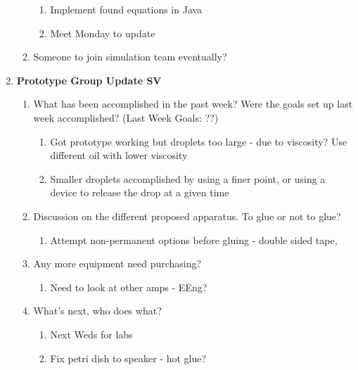 \begin{enumerate}
\begin{enumerate}
\begin{enumerate}
\item  Implement found equations in Java

\item  Meet Monday to update
\end{enumerate}

\item  Someone to join simulation team eventually?\\
\end{enumerate}

\item  \textbf{Prototype Group Update SV}

\begin{enumerate}
\item \textbf{ }What has been accomplished in the past week? Were the goals set up last week accomplished? (Last Week Goals: ??)

\begin{enumerate}
\item  Got prototype working but droplets too large - due to viscosity? Use different oil with lower viscosity

\item  Smaller droplets accomplished by using a finer point, or using a device to release the drop at a given time
\end{enumerate}

\item  Discussion on the different proposed apparatus. To glue or not to glue?

\begin{enumerate}
\item  Attempt non-permanent options before gluing - double sided tape, 
\end{enumerate}

\item  Any more equipment need purchasing?

\begin{enumerate}
\item  Need to look at other amps - EEng?
\end{enumerate}

\item  What's next, who does what?

\begin{enumerate}
\item  Next Weds for labs

\item  Fix petri dish to speaker - hot glue?


\end{enumerate}
\end{enumerate}
\end{enumerate}
